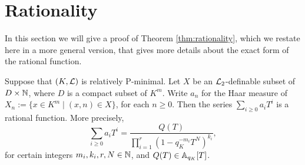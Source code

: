 \section{Rationality}
In this section we will give a proof of Theorem \ref{thm:rationality}, which we restate here in a more general version, that gives more details about the exact form of the rational function. 
\begin{thm}
Suppose that $(K,\cL)$ is relatively P-minimal. Let $X$ be an $\cL_2$-definable subset of $D\times \NN$, where $D$ is a compact subset of $K^m$.  Write $a_n$ for the Haar measure of $X_n:=\{x\in K^m\mid (x,n)\in X\}$, for each $n\geq 0$. Then the series $\sum_{i\geq 0} a_i T^i$ is a rational function. More precisely, 
\[\sum_{i\geq 0} a_i T^i = \frac{Q(T) }{\prod_{i=1}^r(1-q_K^{-m_i}T^N)^{k_i}},\]
for certain integers $m_i, k_i,r, N \in \NN$, and $Q(T) \in \AA_{q_K}[T]$. 
\end{thm}
